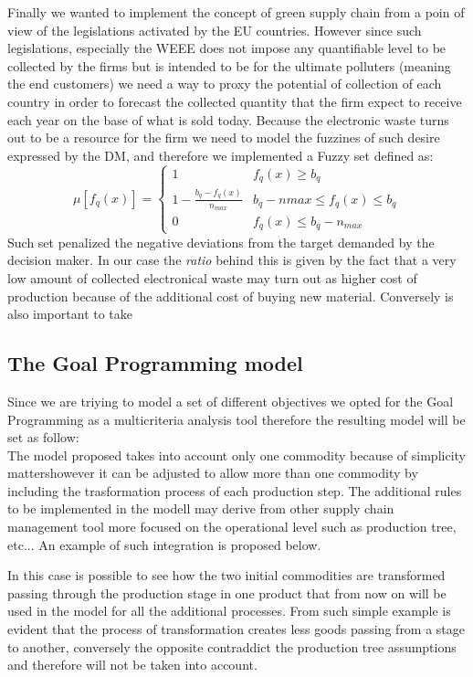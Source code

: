 \documentclass{article}
\begin{document}
Finally we wanted to implement the concept of green supply chain from a poin of view of the legislations activated by the EU countries. However since such legislations, especially the WEEE does not impose any quantifiable level to be collected by the firms but is intended to be for the ultimate polluters (meaning the end customers) we need a way to proxy the potential of collection of each country in order to forecast the collected quantity that the firm expect to receive each year on the base of what is sold today. Because the electronic waste turns out to be a resource for the firm we need to model the fuzzines of such desire expressed by the DM, and therefore we implemented a Fuzzy set\cite{Zadeh_1965} defined as:
$$
\mu [f_q(x)]=
\begin{cases}
1 & f_q(x) \geq b_q \\
1-\frac{b_q-f_q(x)}{n_{max}} & b_q -n{max} \leq f_q(x) \leq b_q \\
0 & f_q(x) \leq b_q - n_{max}
\end{cases}
$$
Such set penalized the negative deviations from the target demanded by the decision maker. In our case the \textit{ratio} behind this is given by the fact that a very low amount of collected electronical waste may turn out as higher cost of production because of the additional cost of buying new material. Conversely is also important to take


\subsection{The Goal Programming model}
Since we are triying to model a set of different objectives we opted for the Goal Programming as a multicriteria analysis tool therefore the resulting model will be set as follow: 
\\
The model proposed takes into account only one commodity because of simplicity mattershowever it can be adjusted to allow more than one commodity by including the trasformation process of each production step. The additional rules to be implemented in the modell may derive from other supply chain management tool more focused on the operational level such as production tree, etc... An example of such integration is proposed below.

In this case is possible to see how the two initial commodities are transformed passing through the production stage in one product that from now on will be used in the model for all the additional processes. From such simple example is evident that the process of transformation creates less goods passing from a stage to another, conversely the opposite contraddict the production tree assumptions and therefore will not be taken into account. 
\end{document}
